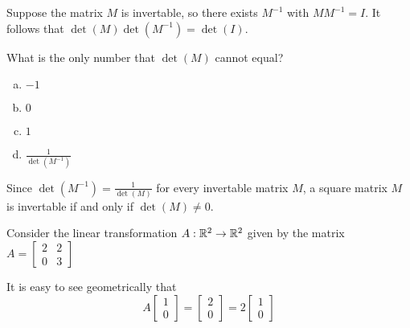 
\begin{applicationActivities}{3}{27}

\begin{activity}{5}
  Suppose the matrix \(M\) is invertable, so there exists \(M^{-1}\)
  with \(MM^{-1}=I\). It follows that \(\det(M)\det(M^{-1})=\det(I)\).

  What is the only number that \(\det(M)\) cannot equal?
  \begin{multicols}{4}
  \begin{enumerate}[(a)]
  \item \(-1\)
  \item \(0\)
  \item \(1\)
  \item \(\frac{1}{\det(M^{-1})}\)
  \end{enumerate}
  \end{multicols}
\end{activity}

\begin{fact}
  Since \(\det(M^{-1})=\frac{1}{\det(M)}\) for every invertable matrix \(M\),
  a square matrix \(M\) is invertable if and only if \(\det(M)\not=0\).
\end{fact}

\begin{observation}
Consider the linear transformation $A : \mathbb{R}^2 \rightarrow \mathbb{R}^2$ given by the matrix $A = \begin{bmatrix} 2 & 2 \\ 0 & 3 \end{bmatrix}$

\begin{center}
\end{center}
It is easy to see geometrically that  $$ A\begin{bmatrix}1 \\ 0 \end{bmatrix} = \begin{bmatrix}2 \\ 0 \end{bmatrix}= 2 \begin{bmatrix}1 \\ 0 \end{bmatrix}$$


\end{observation}
\end{applicationActivities}
